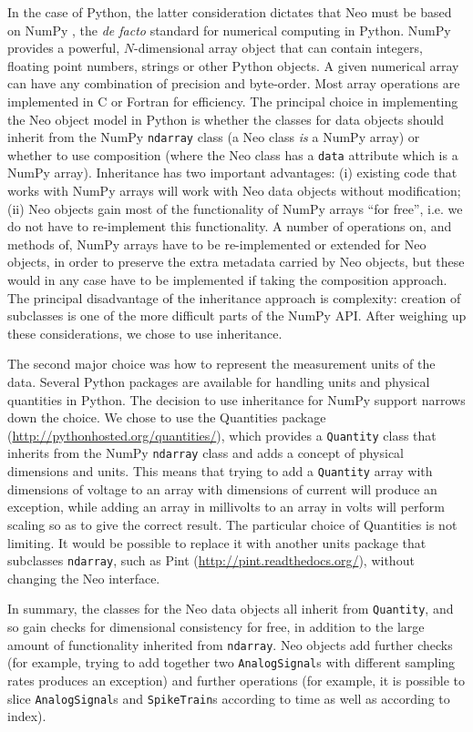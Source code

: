 \documentclass{frontiers}
\newcommand{\latin}[1]{\textit{#1}}
\begin{document}
In the case of Python, the latter consideration dictates that Neo must be based on NumPy \citep{Oliphant2007}, the \latin{de facto} standard for numerical computing in Python.
NumPy provides a powerful, $N$-dimensional array object that can contain integers, floating point numbers, strings or other Python objects.
A given numerical array can have any combination of precision and byte-order.
Most array operations are implemented in C or Fortran for efficiency.
The principal choice in implementing the Neo object model in Python is whether the classes for data objects should inherit from the NumPy \lstinline`ndarray` class (a Neo class \emph{is} a NumPy array) or whether to use composition (where the Neo class has a \lstinline`data` attribute which is a NumPy array).
Inheritance has two important advantages:
(i) existing code that works with NumPy arrays will work with Neo data objects without modification;
(ii) Neo objects gain most of the functionality of NumPy arrays ``for free'', i.e. we do not have to re-implement this functionality. 
A number of operations on, and methods of, NumPy arrays have to be re-implemented or extended for Neo objects, in order to preserve the extra metadata carried by Neo objects, but these would in any case have to be implemented if taking the composition approach.
The principal disadvantage of the inheritance approach is complexity: creation of subclasses is one of the more difficult parts of the NumPy API. After weighing up these considerations, we chose to use inheritance.

The second major choice was how to represent the measurement units of the data.
Several Python packages are available for handling units and physical quantities in Python.
The decision to use inheritance for NumPy support narrows down the choice.
We chose to use the Quantities package (\url{http://pythonhosted.org/quantities/}), which provides a \lstinline`Quantity` class that inherits from the NumPy \lstinline`ndarray` class and adds a concept of physical dimensions and units.
This means that trying to add a \lstinline`Quantity` array with dimensions of voltage to an array with dimensions of current will produce an exception, while adding an array in millivolts to an array in volts will perform scaling so as to give the correct result.
The particular choice of Quantities is not limiting.
It would be possible to replace it with another units package that subclasses \lstinline`ndarray`, such as Pint (\url{http://pint.readthedocs.org/}), without changing the Neo interface.

In summary, the classes for the Neo data objects all inherit from \lstinline`Quantity`, and so gain checks for dimensional consistency for free, in addition to the large amount of functionality inherited from \lstinline`ndarray`.
Neo objects add further checks (for example, trying to add together two \lstinline`AnalogSignal`s with different sampling rates produces an exception) and further operations (for example, it is possible to slice \lstinline`AnalogSignal`s and \lstinline`SpikeTrain`s according to time as well as according to index).
\end{document}
